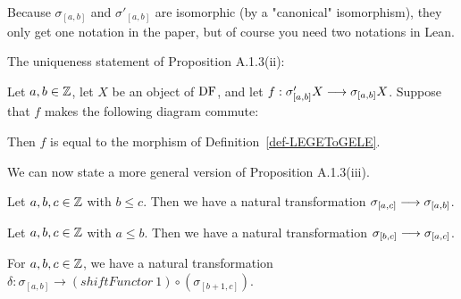 \begin{remark}
Because $\sigma_{[a,b]}$ and $\sigma'_{[a,b]}$ are isomorphic (by a "canonical" isomorphism), they only get 
one notation in the paper, but of course you need two notations in Lean.

\end{remark}

The uniqueness statement of Proposition A.1.3(ii):

\begin{proposition}
\label{prop-LEGEToGELE_uniq}
\leanok
{}

Let $a,b\in\mathbb{Z}$, let $X$ be an object of $\operatorname{DF}$, and let $f:\sigma'_{[a,b]} X\longrightarrow\sigma_{[a,b]}X$. Suppose that
$f$ makes the following diagram commute: 


Then $f$ is equal to the morphism of Definition~\ref{def-LEGEToGELE}.

\end{proposition}

We can now state a more general version of Proposition A.1.3(iii).

\begin{definition}
\label{def-truncGELE_le_up}
\leanok
{}

Let $a,b,c\in\mathbb{Z}$ with $b\le c$. Then we have a natural transformation $\sigma_{[a,c]} \longrightarrow \sigma_{[a,b]}$.

\end{definition}

\begin{definition}
\label{def-truncGELE_le_down}
\leanok
{}

Let $a,b,c\in\mathbb{Z}$ with $a\le b$. Then we have a natural transformation $\sigma_{[b,c]} \longrightarrow \sigma_{[a,c]}$.

\end{definition}

\begin{definition}
\label{def-truncGELE_δ}
\leanok
{}

For $a,b,c\in\mathbb{Z}$, we have a natural transformation
$\delta\colon \sigma_{[a,b]} \to (shiftFunctor\ 1)\circ(\sigma_{[b+1,c]})$.

\end{definition}

